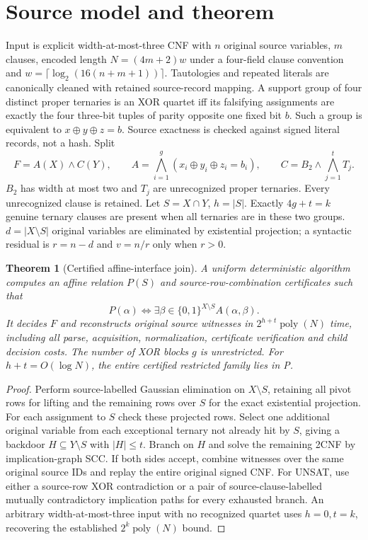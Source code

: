 \documentclass[11pt]{article}
\newtheorem{theorem}{Theorem}
\begin{document}
\section{Source model and theorem}
Input is explicit width-at-most-three CNF with $n$ original source variables, $m$ clauses, encoded length $N=(4m+2)w$ under a four-field clause convention and $w=\lceil\log_2(16(n+m+1))\rceil$. Tautologies and repeated literals are canonically cleaned with retained source-record mapping.
A support group of four distinct proper ternaries is an XOR quartet iff its falsifying assignments are exactly the four three-bit tuples of parity opposite one fixed bit $b$. Such a group is equivalent to $x\oplus y\oplus z=b$. Source exactness is checked against signed literal records, not a hash.
Split
\[
F=A(X)\wedge C(Y),\qquad
A=\bigwedge_{i=1}^g (x_i\oplus y_i\oplus z_i=b_i),\qquad
C=B_2\wedge\bigwedge_{j=1}^{t}T_j.
\]
$B_2$ has width at most two and $T_j$ are unrecognized proper ternaries. Every unrecognized clause is retained. Let $S=X\cap Y$, $h=|S|$. Exactly $4g+t=k$ genuine ternary clauses are present when all ternaries are in these two groups. $d=|X\setminus S|$ original variables are eliminated by existential projection; a syntactic residual is $r=n-d$ and $v=n/r$ only when $r>0$.
\begin{theorem}[Certified affine-interface join]
A uniform deterministic algorithm computes an affine relation $P(S)$ and source-row-combination certificates such that
\[
P(\alpha)\iff \exists\beta\in\{0,1\}^{X\setminus S} A(\alpha,\beta).
\]
It decides $F$ and reconstructs original source witnesses in $2^{h+t}\operatorname{poly}(N)$ time, including all parse, acquisition, normalization, certificate verification and child decision costs. The number of XOR blocks $g$ is unrestricted. For $h+t=O(\log N)$, the entire certified restricted family lies in P.
\end{theorem}
\begin{proof}
Perform source-labelled Gaussian elimination on $X\setminus S$, retaining all pivot rows for lifting and the remaining rows over $S$ for the exact existential projection. For each assignment to $S$ check these projected rows. Select one additional original variable from each exceptional ternary not already hit by $S$, giving a backdoor $H\subseteq Y\setminus S$ with $|H|\le t$. Branch on $H$ and solve the remaining 2CNF by implication-graph SCC. If both sides accept, combine witnesses over the same original source IDs and replay the entire original signed CNF. For UNSAT, use either a source-row XOR contradiction or a pair of source-clause-labelled mutually contradictory implication paths for every exhausted branch. An arbitrary width-at-most-three input with no recognized quartet uses $h=0,t=k$, recovering the established $2^k\operatorname{poly}(N)$ bound.
\end{proof}
\end{document}
